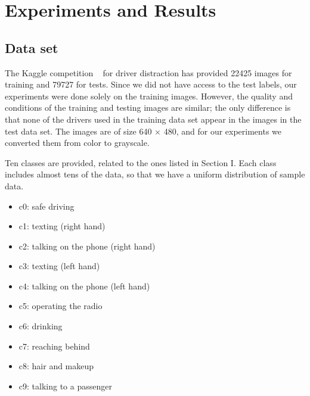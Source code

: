 \documentclass{confproc}
\begin{document}
\section{Experiments and Results}


\subsection{Data set} The Kaggle competition \unskip~\cite{1641075:26775858} for driver distraction has provided 22425 images for training and 79727 for tests. Since we did not have access to the test labels, our experiments were done solely on the training images. However, the quality and conditions of the training and testing images are similar; the only difference is that none of the drivers used in the training data set appear in the images in the test data set. The images are of size 640 \ensuremath{\times} 480, and for our experiments we converted them from color to grayscale.

Ten classes are provided, related to the ones listed in Section I. Each class includes almost tens of the data, so that we have a uniform distribution of sample data.

\begin{itemize}
  \item \relax c0: safe driving
  \item \relax c1: texting (right hand)
  \item \relax c2: talking on the phone (right hand)
  \item \relax c3: texting (left hand)
  \item \relax c4: talking on the phone (left hand)
  \item \relax c5: operating the radio
  \item \relax c6: drinking
  \item \relax c7: reaching behind
  \item \relax c8: hair and makeup
  \item \relax c9: talking to a passenger
\end{itemize}
\end{document}
